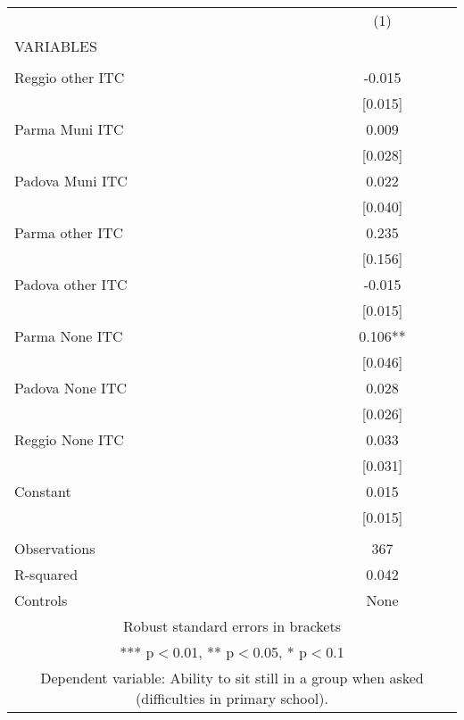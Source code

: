 \begin{tabular}{lc} \hline
 & (1) \\
VARIABLES &  \\ \hline
 &  \\
Reggio other ITC & -0.015 \\
 & [0.015] \\
Parma Muni ITC & 0.009 \\
 & [0.028] \\
Padova Muni ITC & 0.022 \\
 & [0.040] \\
Parma other ITC & 0.235 \\
 & [0.156] \\
Padova other ITC & -0.015 \\
 & [0.015] \\
Parma None ITC & 0.106** \\
 & [0.046] \\
Padova None ITC & 0.028 \\
 & [0.026] \\
Reggio None ITC & 0.033 \\
 & [0.031] \\
Constant & 0.015 \\
 & [0.015] \\
 &  \\
Observations & 367 \\
R-squared & 0.042 \\
 Controls & None \\ \hline
\multicolumn{2}{c}{ Robust standard errors in brackets} \\
\multicolumn{2}{c}{ *** p$<$0.01, ** p$<$0.05, * p$<$0.1} \\
\multicolumn{2}{c}{ Dependent variable: Ability to sit still in a group when asked (difficulties in primary school).} \\
\end{tabular}
